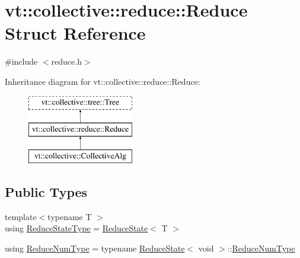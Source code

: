 \hypertarget{structvt_1_1collective_1_1reduce_1_1_reduce}{}\section{vt\+:\+:collective\+:\+:reduce\+:\+:Reduce Struct Reference}
\label{structvt_1_1collective_1_1reduce_1_1_reduce}


{\ttfamily \#include $<$reduce.\+h$>$}

Inheritance diagram for vt\+:\+:collective\+:\+:reduce\+:\+:Reduce\+:\begin{figure}[H]
\begin{center}
\leavevmode
\includegraphics[height=3.000000cm]{structvt_1_1collective_1_1reduce_1_1_reduce}
\end{center}
\end{figure}
\subsection*{Public Types}
\begin{DoxyCompactItemize}
\item 
{\footnotesize template$<$typename T $>$ }\\using \hyperlink{structvt_1_1collective_1_1reduce_1_1_reduce_ac4dc9abaf561d3989a8516e761263fab}{Reduce\+State\+Type} = \hyperlink{structvt_1_1collective_1_1reduce_1_1_reduce_state}{Reduce\+State}$<$ T $>$
\item 
using \hyperlink{structvt_1_1collective_1_1reduce_1_1_reduce_a6fd4d5e956ac5acd321e57c7dad5131f}{Reduce\+Num\+Type} = typename \hyperlink{structvt_1_1collective_1_1reduce_1_1_reduce_state}{Reduce\+State}$<$ void $>$\+::\hyperlink{structvt_1_1collective_1_1reduce_1_1_reduce_a6fd4d5e956ac5acd321e57c7dad5131f}{Reduce\+Num\+Type}
\end{DoxyCompactItemize}
